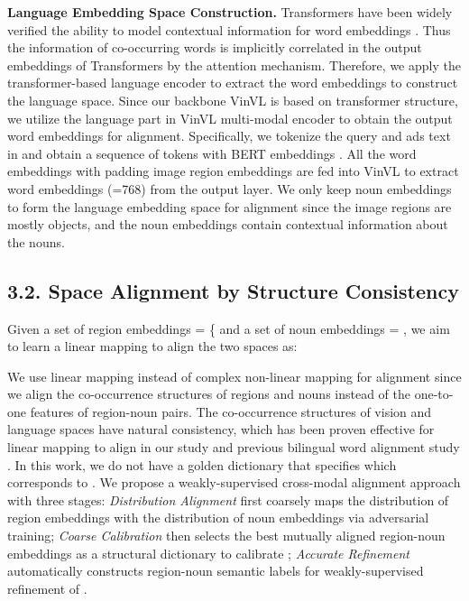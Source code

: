 \documentclass[letterpaper]{article} \usepackage{aaai24}  \usepackage{times}  \usepackage{helvet}  \usepackage{courier}  \usepackage[hyphens]{url}  \usepackage{graphicx} \urlstyle{rm} \def\UrlFont{\rm}  \usepackage{natbib}  \usepackage{caption} \frenchspacing  \setlength{\pdfpagewidth}{8.5in}  \setlength{\pdfpageheight}{11in}
\begin{document}
\noindent\textbf{Language Embedding Space Construction.} 
Transformers have been widely verified the ability to model contextual information for word embeddings \cite{devlin2019bert, floridi2020gpt}. Thus the information of co-occurring words is implicitly correlated in the output embeddings of Transformers by the attention mechanism. Therefore, we apply the transformer-based language encoder to extract the word embeddings to construct the language space. Since our backbone VinVL is based on transformer structure,  we utilize the language part in VinVL multi-modal encoder to obtain the output word embeddings for alignment. Specifically, we tokenize the query  and ads text in   and obtain a sequence of  tokens with BERT embeddings \cite{devlin2019bert}. 
All the word embeddings with padding image region embeddings are fed into VinVL to extract word embeddings  (=768) from the output layer. We only keep noun embeddings to form the language embedding space for alignment since the image regions are mostly objects, and the noun embeddings contain contextual information about the nouns. 

\subsection{3.2. Space Alignment by Structure Consistency}
\label{ssec:space alignment}
Given a set of  region embeddings  = \{  and a set of  noun embeddings  = , we aim to learn a linear mapping  to align the two spaces as: 

We use linear mapping instead of complex non-linear mapping for alignment since we align the co-occurrence structures of regions and nouns instead of the one-to-one features of region-noun pairs. The co-occurrence structures of vision and language spaces have natural consistency, which has been proven effective for linear mapping to align in our study and previous bilingual word alignment study \cite{lample2018word}.  In this work, we do not have a golden dictionary that specifies which  corresponds to . 
We propose a weakly-supervised cross-modal alignment approach with three stages: \textit{Distribution Alignment} first coarsely maps the distribution of region embeddings with the distribution of noun embeddings via adversarial training; \textit{Coarse Calibration} then selects the best mutually aligned region-noun embeddings as a structural dictionary to calibrate ;  \textit{Accurate Refinement} automatically constructs region-noun semantic labels for weakly-supervised refinement of .
\end{document}
